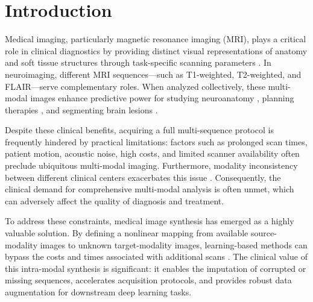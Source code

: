 \documentclass[11pt,a4paper]{article}
\begin{document}



\section{Introduction}
\label{sec:introduction}

Medical imaging, particularly magnetic resonance imaging (MRI), plays a critical role in clinical diagnostics by providing distinct visual representations of anatomy and soft tissue structures through task-specific scanning parameters \cite{CLARKE1995343, AD1999}. In neuroimaging, different MRI sequences---such as T1-weighted, T2-weighted, and FLAIR---serve complementary roles. When analyzed collectively, these multi-modal images enhance predictive power for studying neuroanatomy \cite{7898360}, planning therapies \cite{7738594}, and segmenting brain lesions \cite{HAVAEI201718, kamnitsas_ledig_newcombe_simpson_kane_menon_rueckert_glocker_2017}. 

Despite these clinical benefits, acquiring a full multi-sequence protocol is frequently hindered by practical limitations: factors such as prolonged scan times, patient motion, acoustic noise, high costs, and limited scanner availability often preclude ubiquitous multi-modal imaging. Furthermore, modality inconsistency between different clinical centers exacerbates this issue \cite{chartsias2018}. Consequently, the clinical demand for comprehensive multi-modal analysis is often unmet, which can adversely affect the quality of diagnosis and treatment.

To address these constraints, medical image synthesis has emerged as a highly valuable solution. By defining a nonlinear mapping from available source-modality images to unknown target-modality images, learning-based methods can bypass the costs and times associated with additional scans \cite{10.1007/978-3-642-40811-3_79, huo2018}. The clinical value of this intra-modal synthesis is significant: it enables the imputation of corrupted or missing sequences, accelerates acquisition protocols, and provides robust data augmentation for downstream deep learning tasks. 
\end{document}
